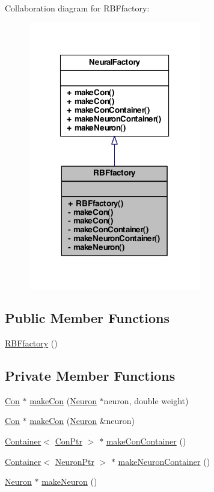 Collaboration diagram for RBFfactory:\nopagebreak
\begin{figure}[H]
\begin{center}
\leavevmode
\includegraphics[width=214pt]{class_r_b_ffactory__coll__graph}
\end{center}
\end{figure}
\subsection*{Public Member Functions}
\begin{DoxyCompactItemize}
\item 
\hyperlink{class_r_b_ffactory_af6d7b55c1c157b296f211c46f253f546}{RBFfactory} ()
\end{DoxyCompactItemize}
\subsection*{Private Member Functions}
\begin{DoxyCompactItemize}
\item 
\hyperlink{class_con}{Con} $\ast$ \hyperlink{class_r_b_ffactory_ac492116058009f39b10252afc121c225}{makeCon} (\hyperlink{class_neuron}{Neuron} $\ast$neuron, double weight)
\item 
\hyperlink{class_con}{Con} $\ast$ \hyperlink{class_r_b_ffactory_a0cb9bbdd1726e28de699eceba731808b}{makeCon} (\hyperlink{class_neuron}{Neuron} \&neuron)
\item 
\hyperlink{class_container}{Container}$<$ \hyperlink{_a_m_o_r_e_8h_a169bb8e5f26ce70bf2b10dec2fb5ee50}{ConPtr} $>$ $\ast$ \hyperlink{class_r_b_ffactory_a844c8fdc315958fdb084194f0b900c68}{makeConContainer} ()
\item 
\hyperlink{class_container}{Container}$<$ \hyperlink{_a_m_o_r_e_8h_ac1ea936c2c7728eb382278131652fef4}{NeuronPtr} $>$ $\ast$ \hyperlink{class_r_b_ffactory_a92fc16863bf60ebd93be1f108ce95ad6}{makeNeuronContainer} ()
\item 
\hyperlink{class_neuron}{Neuron} $\ast$ \hyperlink{class_r_b_ffactory_aa3514a25f378fa5e677970018d2ce65e}{makeNeuron} ()
\end{DoxyCompactItemize}


